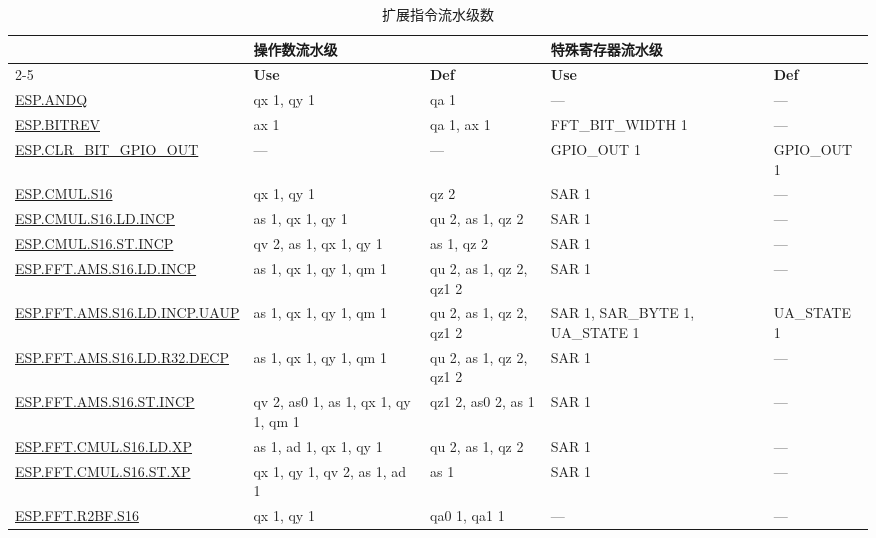 
\begin{longtable}[c]{|l|m{2.5cm}|m{2.5cm}|m{2.5cm}|m{2.5cm}|}
    \caption{扩展指令流水级数}
    \label{tab:pie_inst_pipelining}\\
    \hline
    \rowcolor{lightgray}
     & \multicolumn{2}{l|}{\textbf{操作数流水级}} & \multicolumn{2}{l|}{\textbf{特殊寄存器流水级}} \\\cline{2-5}
    \rowcolor{lightgray}
    \multirow{-2}{1in}{\textbf{指令}} & \textbf{Use} & \textbf{Def} & \textbf{Use} & \textbf{Def} \\\hline
    \hyperref[instruction:ESPANDQ]{ESP.ANDQ} & qx 1, qy 1 & qa 1 & — & — \\\hline
    \hyperref[instruction:ESPBITREV]{ESP.BITREV} & ax 1 & qa 1, ax 1 & FFT\_BIT\_WIDTH 1 & — \\\hline
    \hyperref[instruction:ESPCLRBITGPIOOUT]{ESP.CLR\_BIT\_GPIO\_OUT} & — & — & GPIO\_OUT 1 & GPIO\_OUT 1 \\\hline
    \hyperref[instruction:ESPCMULS16]{ESP.CMUL.S16} & qx 1, qy 1 & qz 2 & SAR 1 & — \\\hline
    \hyperref[instruction:ESPCMULS16LDINCP]{ESP.CMUL.S16.LD.INCP} & as 1, qx 1, qy 1 & qu 2, as 1, qz 2 & SAR 1 & — \\\hline
    \hyperref[instruction:ESPCMULS16STINCP]{ESP.CMUL.S16.ST.INCP} & qv 2, as 1, qx 1, qy 1 & as 1, qz 2 & SAR 1 & — \\\hline
    \hyperref[instruction:ESPFFTAMSS16LDINCP]{ESP.FFT.AMS.S16.LD.INCP} & as 1, qx 1, qy 1, qm 1 & qu 2, as 1, qz 2, qz1 2 & SAR 1 & — \\\hline
    \hyperref[instruction:ESPFFTAMSS16LDINCPUAUP]{ESP.FFT.AMS.S16.LD.INCP.UAUP} & as 1, qx 1, qy 1, qm 1 & qu 2, as 1, qz 2, qz1 2 & SAR 1, SAR\_BYTE 1, UA\_STATE 1 & UA\_STATE 1\\\hline
    \hyperref[instruction:ESPFFTAMSS16LDR32DECP]{ESP.FFT.AMS.S16.LD.R32.DECP} & as 1, qx 1, qy 1, qm 1 & qu 2, as 1, qz 2, qz1 2 & SAR 1 & — \\\hline
    \hyperref[instruction:ESPFFTAMSS16STINCP]{ESP.FFT.AMS.S16.ST.INCP} & qv 2, as0 1, as 1, qx 1, qy 1, qm 1 & qz1 2, as0 2, as 1 & SAR 1 & — \\\hline
    \hyperref[instruction:ESPFFTCMULS16LDXP]{ESP.FFT.CMUL.S16.LD.XP} & as 1, ad 1, qx 1, qy 1 & qu 2, as 1, qz 2 & SAR 1 & — \\\hline
    \hyperref[instruction:ESPFFTCMULS16STXP]{ESP.FFT.CMUL.S16.ST.XP} & qx 1, qy 1, qv 2, as 1, ad 1 & as 1 & SAR 1 & — \\\hline
    \hyperref[instruction:ESPFFTR2BFS16]{ESP.FFT.R2BF.S16} & qx 1, qy 1 & qa0 1, qa1 1 & — & — \\\hline

\end{longtable}
